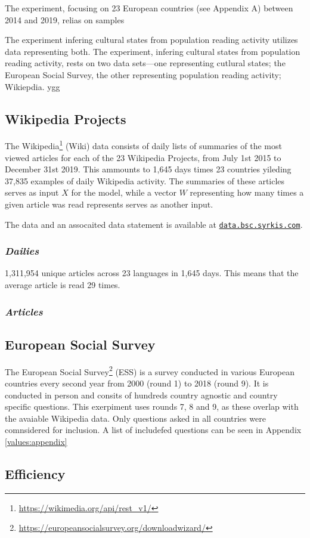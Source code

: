 The experiment, focusing on 23 European countries (see Appendix A) between 2014 and 2019, relias on samples


The experiment infering cultural states from population reading activity utilizes data representing both. The experiment, infering cultural states from population reading activity, rests on two data sets—one representing cutlural states; the European Social Survey, the other representing population reading activity; Wikiepdia.
ygg

\subsection*{Wikipedia Projects}

The Wikipedia\footnote{\url{https://wikimedia.org/api/rest_v1/}} (Wiki) data consists of daily lists of summaries of the most viewed articles for each of the 23 Wikipedia Projects, from July 1st 2015 to December 31st 2019.
This ammounts to 1,645 days times 23 countries yileding 37,835 examples of daily Wikipedia activity.
The summaries of these articles serves as input $X$ for the model, while a vector $W$ representing how many times a given article was read represents serves as another input.

The data and an assocaited data statement is available at \href{https://data.bsc.syrkis.com}{\texttt{data.bsc.syrkis.com}}.

\subsubsection*{\emph{Dailies}}
1,311,954 unique articles across 23 languages in 1,645 days. This means that the average article is read 29 times.

\subsubsection*{\emph{Articles}}

\subsection*{European Social Survey}

The European Social Survey\footnote{\url{https://europeansocialsurvey.org/downloadwizard/}} (ESS) is a survey conducted in various European countries every second year from 2000 (round 1) to 2018 (round 9). It is conducted in person and consits of hundreds country agnostic and country specific questions. This exerpiment uses rounds 7, 8 and 9, as these overlap with the avaiable Wikipedia data.
Only questions asked in all countries were comnsidered for inclusion. A list of includefed questions can be seen in Appendix \ref{values:appendix}


\subsection*{Efficiency}

